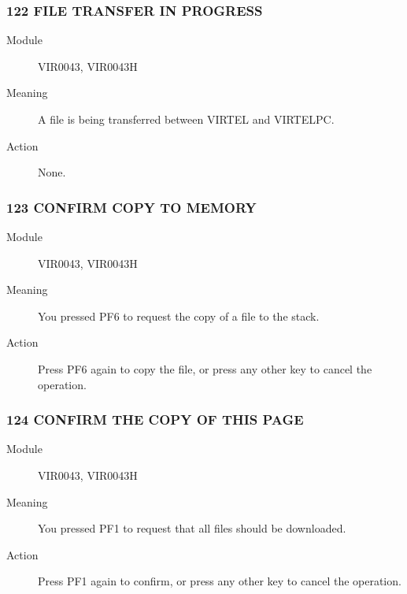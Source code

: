 \documentclass[letterpaper,10pt,english]{sphinxmanual}
\begin{document}
\subsubsection{122 FILE TRANSFER IN PROGRESS}
\label{\detokenize{messages:file-transfer-in-progress}}\begin{description}
\item[{Module}] \leavevmode
VIR0043, VIR0043H

\item[{Meaning}] \leavevmode
A file is being transferred between VIRTEL and VIRTELPC.

\item[{Action}] \leavevmode
None.

\end{description}


\subsubsection{123 CONFIRM COPY TO MEMORY}
\label{\detokenize{messages:confirm-copy-to-memory}}\begin{description}
\item[{Module}] \leavevmode
VIR0043, VIR0043H

\item[{Meaning}] \leavevmode
You pressed PF6 to request the copy of a file to the stack.

\item[{Action}] \leavevmode
Press PF6 again to copy the file, or press any other key to cancel the operation.

\end{description}


\subsubsection{124 CONFIRM THE COPY OF THIS PAGE}
\label{\detokenize{messages:confirm-the-copy-of-this-page}}\begin{description}
\item[{Module}] \leavevmode
VIR0043, VIR0043H

\item[{Meaning}] \leavevmode
You pressed PF1 to request that all files should be downloaded.

\item[{Action}] \leavevmode
Press PF1 again to confirm, or press any other key to cancel the operation.

\end{description}
\end{document}

